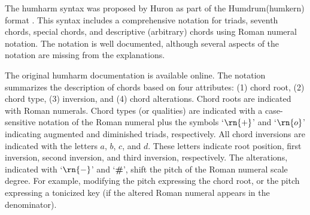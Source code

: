

The \gls{humharm} syntax was proposed by Huron as part of
the Humdrum(\gls{humkern}) format
\parencite{huron1994humdrum}. This syntax includes a
comprehensive notation for triads, seventh chords, special
chords, and descriptive (arbitrary) chords using Roman
numeral notation. The notation is well documented, although
several aspects of the notation are missing from the
explanations.

The original \gls{humharm} documentation is available
online.
The notation summarizes the description of chords based on
four attributes: (1) chord root, (2) chord type, (3)
inversion, and (4) chord alterations. Chord roots are
indicated with Roman numerals. Chord types (or qualities)
are indicated with a case-sensitive notation of the Roman
numeral plus the symbols `$\rn{+}$' and `$\rn{o}$'
indicating augmented and diminished triads, respectively.
All chord inversions are indicated with the letters $a$,
$b$, $c$, and $d$. These letters indicate root position,
first inversion, second inversion, and third inversion,
respectively. The alterations, indicated with `$\rn{-}$' and
`\textbf{\#}', shift the pitch of the Roman numeral scale
degree. For example, modifying the pitch expressing the
chord root, or the pitch expressing a tonicized key (if the
altered Roman numeral appears in the denominator).
